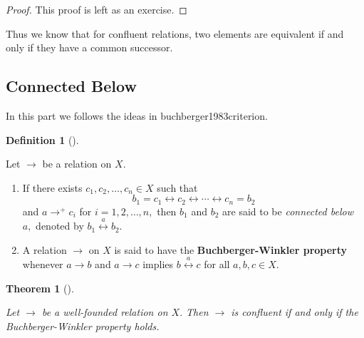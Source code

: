 \documentclass[
  letterpaper,
  10pt,
  reqno,
  twopage,
  openany]{book}
\providecommand{\tightlist}{%
  \setlength{\itemsep}{0pt}\setlength{\parskip}{0pt}}\usepackage{longtable,booktabs,array}
\theoremstyle{plain}
\theoremstyle{definition}
\theoremstyle{definition}
\newtheorem{definition}{Definition}[chapter]
\theoremstyle{definition}
\theoremstyle{plain}
\theoremstyle{plain}
\newtheorem{theorem}{Theorem}[chapter]
\theoremstyle{remark}
\begin{document}
\begin{proof}

This proof is left as an exercise.

\end{proof}

Thus we know that for confluent relations, two elements are equivalent
if and only if they have a common successor.

\hypertarget{connected-below}{%
\subsection{Connected Below}\label{connected-below}}

In this part we follows the ideas in buchberger1983criterion.

\leavevmode{}%
\begin{definition}[]\label{def-connected-below-buchberger-Winkler}

Let \(\longrightarrow\) be a relation on \(X.\)

\begin{enumerate}
\def\labelenumi{\arabic{enumi}.}
\tightlist
\item
  If there exists \(c_1,c_2,\ldots,c_n\in X\) such that
  \[b_1=c_1\longleftrightarrow c_2\longleftrightarrow \cdots \longleftrightarrow c_n=b_2\]
  and \(a\longrightarrow^+ c_i\) for \(i=1,2,\ldots,n,\) then \(b_1\)
  and \(b_2\) are said to be  \emph{connected
  below} \(a,\) denoted by
  \(b_1 \stackrel{a}{\longleftrightarrow} b_2.\)
\item
  A relation \(\longrightarrow\) on \(X\) is said to have the
   \textbf{Buchberger-Winkler
  property} whenever \(a\longrightarrow b\) and \(a\longrightarrow c\)
  implies \(b \stackrel{a}{\longleftrightarrow} c\) for all
  \(a,b,c\in X.\)
\end{enumerate}

\end{definition}

\leavevmode{}%
\begin{theorem}[]\label{thm-buchberger-winkler-property}

Let \(\longrightarrow\) be a well-founded relation on \(X.\) Then
\(\longrightarrow\) is confluent if and only if the Buchberger-Winkler
property holds.

\end{theorem}
\end{document}
